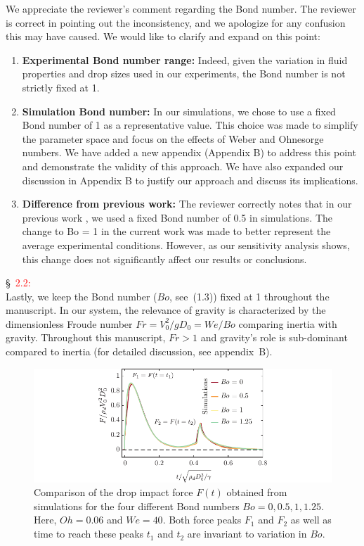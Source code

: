 \documentclass[]{article}
\newcommand*\red{\textcolor{red}}
\newcommand{\oo}{\color{magenta} \normalfont}
\newcommand{\bb}{\color{black} \normalfont}
\begin{document}
\begin{enumerate}
\begin{itemize}
		We appreciate the reviewer's comment regarding the Bond number. 
		The reviewer is correct in pointing out the inconsistency, and we apologize for any confusion this may have caused. We would like to clarify and expand on this point:

		\begin{enumerate}
			\item \textbf{Experimental Bond number range:}
			Indeed, given the variation in fluid properties and drop sizes used in our experiments, the Bond number is not strictly fixed at 1. 
			\item \textbf{Simulation Bond number:}
			In our simulations, we chose to use a fixed Bond number of 1 as a representative value. This choice was made to simplify the parameter space and focus on the effects of Weber and Ohnesorge numbers. We have added a new appendix (Appendix B) to address this point and demonstrate the validity of this approach. We have also expanded our discussion in Appendix B to justify our approach and discuss its implications.
			\item \textbf{Difference from previous work:}
			The reviewer correctly notes that in our previous work \citep{zhang2022impact}, we used a fixed Bond number of 0.5 in simulations. The change to Bo = 1 in the current work was made to better represent the average experimental conditions. However, as our sensitivity analysis shows, this change does not significantly affect our results or conclusions.
		\end{enumerate}		
		
		\S~\red{2.2:}\\
		\oo
		Lastly, we keep the Bond number ($Bo$, see~(1.3)) fixed at 1 throughout the manuscript. In our system, the relevance of gravity is characterized by the dimensionless Froude number $Fr = V_0^2/gD_0 = We/Bo$ comparing inertia with gravity. Throughout this manuscript, $Fr > 1$ and gravity's role is sub-dominant compared to inertia (for detailed discussion, see appendix~B).
		\bb
		
		\begin{figure}
			\centering
			\includegraphics[width=\textwidth]{../main/Figures/figureA1.pdf}
			\caption{{\oo Comparison of the drop impact force $F(t)$ obtained from simulations for the four different Bond numbers $Bo = 0, 0.5, 1, 1.25$. Here, $Oh = 0.06$ and $We = 40$. Both force peaks $F_1$ and $F_2$ as well as time to reach these peaks $t_1$ and $t_2$ are invariant to variation in $Bo$. \bb}}
			\label{fig:AppGravity}
		\end{figure}
		

\end{itemize}
\end{enumerate}
\end{document}
